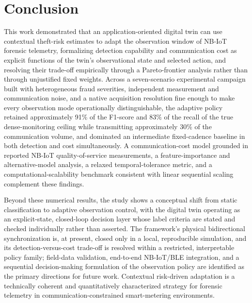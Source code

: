 \documentclass{ieeeaccess}
\begin{document}
\section{Conclusion}
\label{sec:Conclusion}
This work demonstrated that an application-oriented digital twin can use contextual theft-risk estimates to adapt the observation window of NB-IoT forensic telemetry, formalizing detection capability and communication cost as explicit functions of the twin's observational state and selected action, and resolving their trade-off empirically through a Pareto-frontier analysis rather than through unjustified fixed weights. Across a seven-scenario experimental campaign built with heterogeneous fraud severities, independent measurement and communication noise, and a native acquisition resolution fine enough to make every observation mode operationally distinguishable, the adaptive policy retained approximately 91\% of the F1-score and 83\% of the recall of the true dense-monitoring ceiling while transmitting approximately 30\% of the communication volume, and dominated an intermediate fixed-cadence baseline in both detection and cost simultaneously. A communication-cost model grounded in reported NB-IoT quality-of-service measurements, a feature-importance and alternative-model analysis, a relaxed temporal-tolerance metric, and a computational-scalability benchmark consistent with linear sequential scaling complement these findings.

Beyond these numerical results, the study shows a conceptual shift from static classification to adaptive observation control, with the digital twin operating as an explicit-state, closed-loop decision layer whose label criteria are stated and checked individually rather than asserted. The framework's physical bidirectional synchronization is, at present, closed only in a local, reproducible simulation, and its detection-versus-cost trade-off is resolved within a restricted, interpretable policy family; field-data validation, end-to-end NB-IoT/BLE integration, and a sequential decision-making formulation of the observation policy are identified as the primary directions for future work. Contextual risk-driven adaptation is a technically coherent and quantitatively characterized strategy for forensic telemetry in communication-constrained smart-metering environments.
\end{document}
